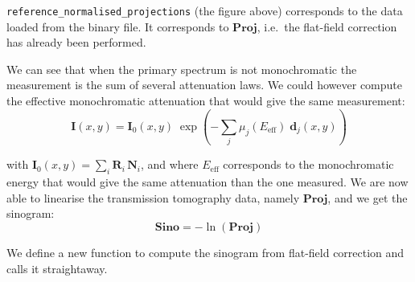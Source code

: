 \documentclass[11pt]{article}
\begin{document}
\texttt{reference\_normalised\_projections} (the figure above)
corresponds to the data loaded from the binary file. It corresponds to
\(\mathbf{Proj}\), i.e.~the flat-field correction has already been
performed.

We can see that when the primary spectrum is not monochromatic the
measurement is the sum of several attenuation laws. We could however
compute the effective monochromatic attenuation that would give the same
measurement:
\[    \mathbf{I}(x,y) = \mathbf{I}_0(x,y) \; \exp\left({-\sum_j \mu_j(E_{\mathrm{eff}}) \; \mathbf{d}_j(x,y)}\right)\]

with \(\mathbf{I}_0(x,y) = \sum_i \mathbf{R}_i \, \mathbf{N}_i\), and
where \(E_{\mathrm{eff}}\) corresponds to the monochromatic energy that
would give the same attenuation than the one measured. We are now able
to linearise the transmission tomography data, namely \(\mathbf{Proj}\),
and we get the sinogram:
\[\textbf{Sino}=-\ln\left(\textbf{Proj}\right)\]

We define a new function to compute the sinogram from flat-field
correction and calls it straightaway.
\end{document}
